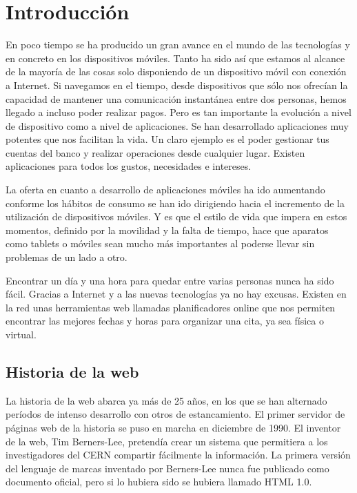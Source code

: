 \documentclass[a4paper, 12pt]{book}
\begin{document}
\cleardoublepage
\chapter{Introducci\'on}
\label{sec:intro} %

En poco tiempo se ha producido un gran avance en el mundo de las tecnolog\'ias y en concreto
en los dispositivos m\'oviles. Tanto ha sido as\'i que estamos al alcance de la mayor\'ia de las
cosas solo disponiendo de un dispositivo m\'ovil con conexi\'on a Internet. Si navegamos en el
tiempo, desde dispositivos que s\'olo nos ofrec\'ian la capacidad de mantener una comunicaci\'on
instant\'anea entre dos personas, hemos llegado a incluso poder realizar pagos. Pero es tan importante
la evoluci\'on a nivel de dispositivo como a nivel de aplicaciones. Se han desarrollado
aplicaciones muy potentes que nos facilitan la vida. Un claro ejemplo es el poder gestionar tus
cuentas del banco y realizar operaciones desde cualquier lugar. Existen aplicaciones
para todos los gustos, necesidades e intereses.

La oferta en cuanto a desarrollo de aplicaciones m\'oviles ha ido aumentando conforme los h\'abitos de consumo se han ido dirigiendo hacia el incremento de la utilizaci\'on de dispositivos m\'oviles. Y es que el estilo de vida que impera en estos momentos, definido por la movilidad y la falta de tiempo, hace que aparatos como tablets o m\'oviles sean mucho m\'as importantes al poderse llevar sin problemas de un lado a otro.

Encontrar un d\'ia y una hora para quedar entre varias personas nunca ha sido f\'acil. Gracias a Internet y a las nuevas tecnolog\'ias ya no hay excusas. Existen en la red unas herramientas web llamadas planificadores online que nos permiten encontrar las mejores fechas y horas para organizar una cita, ya sea f\'isica o virtual.

\section{Historia de la web}
\label{sec:seccion}

La historia de la web\cite{Historia} abarca ya m\'as de 25 a\~nos, en los que se han alternado per\'iodos de intenso desarrollo con otros de estancamiento. El primer servidor de p\'aginas web de la historia se puso en marcha en diciembre de 1990. El inventor de la web, Tim Berners-Lee, pretend\'ia crear un sistema que permitiera a los investigadores del CERN compartir f\'acilmente la informaci\'on. La primera versi\'on del lenguaje de marcas inventado por Berners-Lee nunca fue publicado como documento oficial, pero si lo hubiera sido se hubiera llamado HTML 1.0.
\end{document}
